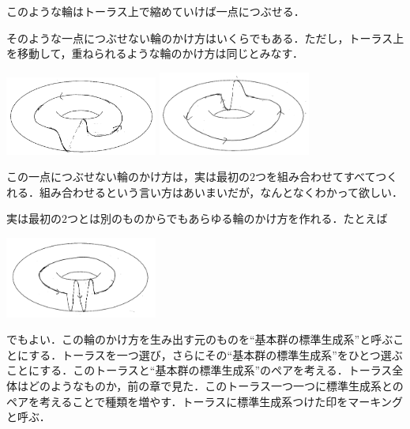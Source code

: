 このような輪はトーラス上で縮めていけば一点につぶせる．

そのような一点につぶせない輪のかけ方はいくらでもある．ただし，トーラス上を移動して，重ねられるような輪のかけ方は同じとみなす．
\begin{center}
\includegraphics[width=5cm]{asaka12.png}
\includegraphics[width=5cm]{asaka121.png}
\end{center}
この一点につぶせない輪のかけ方は，実は最初の$2$つを組み合わせてすべてつくれる．組み合わせるという言い方はあいまいだが，なんとなくわかって欲しい．

実は最初の$2$つとは別のものからでもあらゆる輪のかけ方を作れる．たとえば
\begin{center}
\includegraphics[width=5cm]{asaka14.png}
\end{center}
でもよい．この輪のかけ方を生み出す元のものを``基本群の標準生成系''と呼ぶことにする．トーラスを一つ選び，さらにその``基本群の標準生成系''をひとつ選ぶことにする．このトーラスと``基本群の標準生成系''のペアを考える．トーラス全体はどのようなものか，前の章で見た．このトーラス一つ一つに標準生成系とのペアを考えることで種類を増やす．トーラスに標準生成系つけた印をマーキングと呼ぶ．

